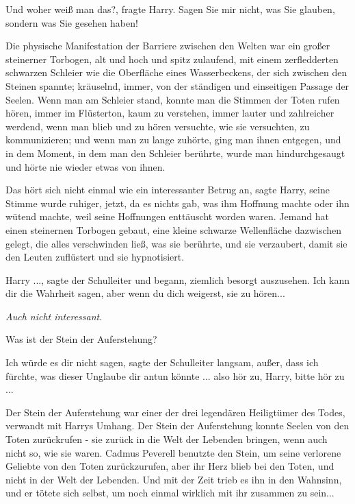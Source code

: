 \glqq Und woher weiß man das?\grqq{}, fragte Harry. \glqq Sagen Sie mir nicht,
was Sie glauben, sondern was Sie gesehen haben!\grqq{}

Die physische Manifestation der Barriere zwischen den Welten war ein großer
steinerner Torbogen, alt und hoch und spitz zulaufend, mit einem zerfledderten
schwarzen Schleier wie die Oberfläche eines Wasserbeckens, der sich zwischen den
Steinen spannte; kräuselnd, immer, von der ständigen und einseitigen Passage der
Seelen. Wenn man am Schleier stand, konnte man die Stimmen der Toten rufen
hören, immer im Flüsterton, kaum zu verstehen, immer lauter und zahlreicher
werdend, wenn man blieb und zu hören versuchte, wie sie versuchten, zu
kommunizieren; und wenn man zu lange zuhörte, ging man ihnen entgegen, und in
dem Moment, in dem man den Schleier berührte, wurde man hindurchgesaugt und
hörte nie wieder etwas von ihnen.

\glqq Das hört sich nicht einmal wie ein interessanter Betrug an\grqq{}, sagte
Harry, seine Stimme wurde ruhiger, jetzt, da es nichts gab, was ihm Hoffnung
machte oder ihn wütend machte, weil seine Hoffnungen enttäuscht worden waren.
\glqq Jemand hat einen steinernen Torbogen gebaut, eine kleine schwarze
Wellenfläche dazwischen gelegt, die alles verschwinden ließ, was sie berührte,
und sie verzaubert, damit sie den Leuten zuflüstert und sie hypnotisiert.\grqq{}

\glqq Harry ...\grqq{}, sagte der Schulleiter und begann, ziemlich besorgt
auszusehen. \glqq Ich kann dir die Wahrheit sagen, aber wenn du dich weigerst,
sie zu hören...\grqq{}

\emph{Auch nicht interessant}.

\glqq Was ist der Stein der Auferstehung?\grqq{}

\glqq Ich würde es dir nicht sagen\grqq{}, sagte der Schulleiter langsam, \glqq
außer, dass ich fürchte, was dieser Unglaube dir antun könnte ... also hör zu,
Harry, bitte hör zu ...\grqq{}

Der Stein der Auferstehung war einer der drei legendären Heiligtümer des Todes,
verwandt mit Harrys Umhang. Der Stein der Auferstehung konnte Seelen von den
Toten zurückrufen - sie zurück in die Welt der Lebenden bringen, wenn auch nicht
so, wie sie waren. Cadmus Peverell benutzte den Stein, um seine verlorene
Geliebte von den Toten zurückzurufen, aber ihr Herz blieb bei den Toten, und
nicht in der Welt der Lebenden. Und mit der Zeit trieb es ihn in den Wahnsinn,
und er tötete sich selbst, um noch einmal wirklich mit ihr zusammen zu sein...

